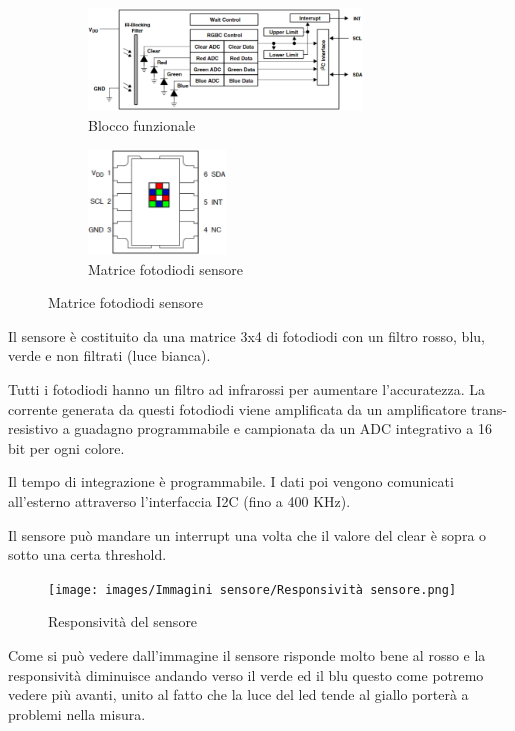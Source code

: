 \documentclass[12pt]{report}
\begin{document}
\begin{figure} [H]
    \begin{subfigure}{0.5\textwidth}
    \includegraphics[width=0.8\textwidth]{images/Immagini sensore/Blocco funzionale.png}
    \caption{Blocco funzionale}
    \end{subfigure}
    \begin{subfigure}{0.4\textwidth}
    \includegraphics[width=0.4\textwidth]{images/Immagini sensore/sensore.png}
    \caption{Matrice fotodiodi sensore}
    \end{subfigure}
\end{figure}

Il sensore è costituito da una matrice 3x4 di fotodiodi con un filtro rosso, blu, verde e non filtrati (luce bianca). 

Tutti i fotodiodi hanno un filtro ad infrarossi per aumentare l'accuratezza. 
La corrente generata da questi fotodiodi viene amplificata da un amplificatore trans-resistivo a guadagno programmabile e campionata da un ADC integrativo a 16 bit per ogni colore. 

Il tempo di integrazione è programmabile. I dati poi vengono comunicati all'esterno attraverso l'interfaccia I2C (fino a 400 KHz). 

Il sensore può mandare un interrupt una volta che il valore del clear è sopra o sotto una certa threshold.

\begin{figure}[h]
    \centering
    \texttt{[image: images/Immagini sensore/Responsività sensore.png]}
    \caption{Responsività del sensore}
\end{figure}

Come si può vedere dall'immagine il sensore risponde molto bene al rosso e la responsività diminuisce andando verso il verde ed il blu questo come potremo vedere più avanti, 
unito al fatto che la luce del led tende al giallo porterà a problemi nella misura.
\end{document}

